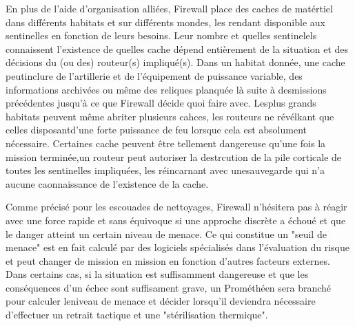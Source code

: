 En plus de l'aide d'organisation alliées, Firewall place des caches de matértiel dans différents habitats et sur différents mondes, les rendant disponible aux sentinelles en fonction de leurs besoins. Leur nombre et quelles sentinelels connaissent l'existence de quelles cache dépend entièrement de la situation et des décisions du (ou des) routeur(s) impliqué(s). Dans un habitat donnée, une cache peutinclure de l'artillerie et de l'équipement de puissance variable, des informations archivées ou même des reliques planquée là suite à desmissions précédentes jusqu'à ce que Firewall décide quoi faire avec. Lesplus grands habitats peuvent même abriter plusieurs cahces, les routeurs ne révélkant que celles disposantd'une forte puissance de feu lorsque cela est absolument nécessaire. Certaines cache peuvent être tellement dangereuse qu'une fois la mission terminée,un routeur peut autoriser la destrcution de la pile corticale de toutes les sentinelles impliquées, les réincarnant avec unesauvegarde qui n'a aucune caonnaissance de l'existence de la cache. 

Comme précisé pour les escouades de nettoyages, Firewall n'hésitera pas à réagir avec une force rapide et sans équivoque si une approche discrète a échoué et que le danger atteint un certain niveau de menace. Ce qui constitue un "seuil de menace" est en fait calculé par des logiciels spécialisés dans l'évaluation du risque et peut changer de mission en mission en fonction d'autres facteurs externes. Dans certains cas, si la situation est suffisamment dangereuse et que les conséquences d'un échec sont suffisament grave, un Prométhéen sera branché pour calculer leniveau de menace et décider lorsqu'il deviendra nécessaire d'effectuer un retrait tactique et une "stérilisation thermique". 

